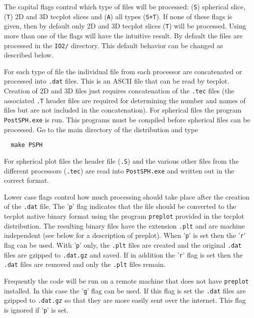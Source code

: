The capital flags control which type of files will be processed:
({\tt S}) spherical slice, ({\tt T}) 2D and 3D tecplot slices
and ({\tt A}) all types ({\tt S+T}).  If none of these flags is given, then
by default only 2D and 3D tecplot slices ({\tt T}) will be processed.
Using more than one of the flags will have the intuitive result.
By default the files are processed in the {\tt IO2/} directory. This
default behavior can be changed as described below.

For each type of file the individual file from each processor are
concatenated or processed into {\tt .dat} files.  This is an ASCII file
that can be read by tecplot.  Creation of 2D and 3D files just requires
concatenation of the {\tt .tec} files (the associated {\tt .T} header
files are required for determining the number and names of files but
are not included in the concatenation). For spherical files the
program {\tt PostSPH.exe} is run.  This programs must be compiled
before spherical files can be processed.  Go to the main
directory of the distribution and type
\begin{verbatim}
  make PSPH
\end{verbatim}
For spherical plot files the header file ({\tt .S}) 
and the various other files from the different processors 
({\tt .tec}) are read into {\tt PostSPH.exe} 
and written out in the correct format.

Lower case flags control how much processing should take place after
the creation of the {\tt .dat} file.  The '{\tt p}' flag indicates that
the file should be converted to the tecplot native binary format using
the program {\tt preplot} provided in the tecplot distribution.  The
resulting binary files have the extension {\tt .plt} and are machine
independent (see below for a description of preplot).  When '{\tt p}'
is set then the '{\tt r}' flag can be used.  With '{\tt p}' only, the
{\tt .plt} files are created and the original {\tt .dat} files are
gzipped to {\tt.dat.gz} and saved.  If in addition the '{\tt r}' flag
is set then the {\tt .dat} files are removed and only the {\tt .plt}
files remain.

Frequently the code will be run on a remote machine that does not
have {\tt preplot} installed.  In this case the '{\tt g}' flag
can be used.  If this flag is set the {\tt .dat} files are gzipped
to {\tt .dat.gz} so that they are more easily sent over the internet.
This flag is ignored if '{\tt p}' is set.

